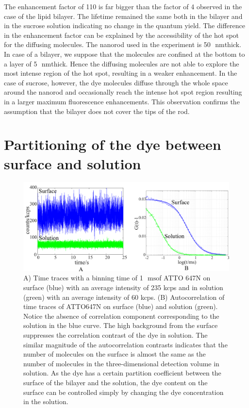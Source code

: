 \documentclass[11pt,a4paper,onecolumn]{article}
\newcommand{\nm}{\ensuremath{\,\textrm{nm}}}
\newcommand{\ms}{\ensuremath{\,\textrm{ms}}}
\begin{document}
The enhancement factor of 110 is far bigger than the factor of 4 observed in the case of the lipid bilayer. The lifetime remained the same both in the bilayer and in the sucrose solution indicating no change in the quantum yield. The difference in the enhancement factor can be explained by the accessibility of the hot spot for the diffusing molecules. The nanorod used in the experiment is 50~\nm thick. In case of a bilayer, we suppose that the molecules are confined at the bottom to a layer of 5~\nm thick. Hence the diffusing molecules are not able to explore the most intense region of the hot spot, resulting in a weaker enhancement. In the case of sucrose, however, the dye molecules diffuse through the whole space around the nanorod and occasionally reach the intense hot spot region resulting in a larger maximum fluorescence enhancements. This observation confirms the assumption that the bilayer does not cover the tips of the rod.
\newpage
\section{Partitioning of the dye between surface and solution}
\begin{figure}[ht]
  \centering
  \includegraphics[width=\textwidth]{surf_soln.png}
  \makeatletter
  \renewcommand{\fnum@figure}{\figurename~S\thefigure}
  \makeatother{}
  \caption{A) Time traces with a binning time of 1~\ms of ATTO 647N on surface (blue) with an average intensity of 235 kcps and in solution (green) with an average intensity of 60 kcps. (B) Autocorrelation of time traces of ATTO647N on surface (blue) and solution (green). Notice the absence of correlation component corresponding to the solution in the blue curve. The high background from the surface suppresses the correlation contrast of the dye in solution. The similar magnitude of the autocorrelation contrasts indicates that the number of molecules on the surface is almost the same as the number of molecules in the three-dimensional detection volume in solution. As the dye has a certain partition coefficient between the surface of the bilayer and the solution, the dye content on the surface can be controlled simply by changing the dye concentration in the solution.}
  \label{SIfig:surf-soln}
\end{figure}

\pagebreak

\end{document}
